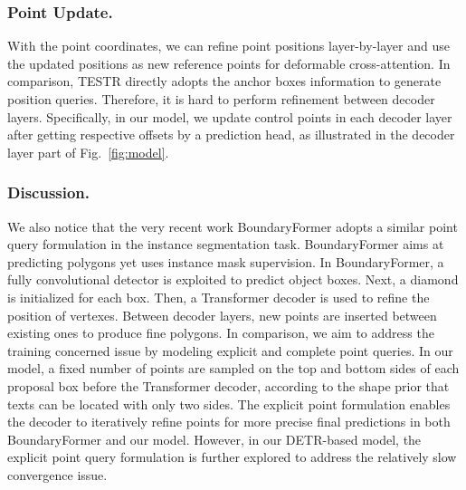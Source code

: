 \documentclass[letterpaper]{article} \usepackage{aaai23}  \usepackage{times}  \usepackage{helvet}  \usepackage{courier}  \usepackage[hyphens]{url}  \usepackage{graphicx} \urlstyle{rm}
\begin{document}
\subsubsection{Point Update.} With the point coordinates, we can refine point positions layer-by-layer and use the updated positions as new reference points for deformable cross-attention. In comparison, TESTR directly adopts the anchor boxes information to generate position queries. Therefore, it is hard to perform refinement between decoder layers. Specifically, in our model, we update control points in each decoder layer after getting respective offsets  by a prediction head, as illustrated in the decoder layer part of Fig.~\ref{fig:model}.

 \subsubsection{Discussion.} We also notice that the very recent work BoundaryFormer \cite{lazarow2022instance} adopts a similar point query formulation in the instance segmentation task. BoundaryFormer aims at predicting polygons yet uses instance mask supervision. In BoundaryFormer, a fully convolutional detector \cite{ren2015faster,tian2019fcos} is exploited to predict object boxes. Next, a diamond is initialized for each box. Then, a Transformer decoder is used to refine the position of vertexes. Between decoder layers, new points are inserted between existing ones to produce fine polygons. In comparison, we aim to address the training concerned issue by modeling explicit and complete point queries. In our model, a fixed number of points are sampled on the top and bottom sides of each proposal box before the Transformer decoder, according to the shape prior that texts can be located with only two sides. The explicit point formulation enables the decoder to iteratively refine points for more precise final predictions in both BoundaryFormer and our model. However, in our DETR-based model, the explicit point query formulation is further explored to address the relatively slow convergence issue.
\end{document}
